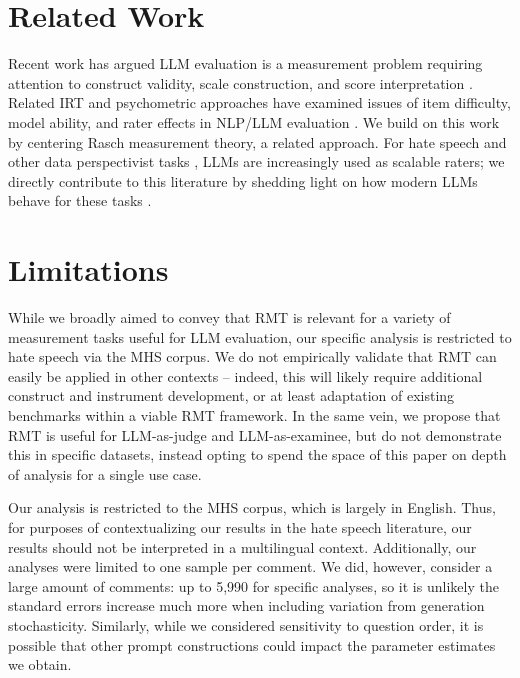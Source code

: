 \documentclass[11pt]{article}
\begin{document}
\section{Related Work}
\label{sec:related}
Recent work has argued LLM evaluation is a measurement problem requiring attention to construct validity, scale construction, and score interpretation \cite{Wallach2025GenAIMeasurement, Salaudeen2025MeasurementToMeaning, Zhou2026GeneralScales}. Related IRT and psychometric approaches have examined issues of item difficulty, model ability, and rater effects in NLP/LLM evaluation \cite{lalor2016building, vania2021comparing, rodriguez2021evaluation, Bachmann2024Psychometrics, Federiakin2025Leaderboards, Chen2025CompactIRT, Yao2025JEIRT, Keller2026StatisticalModels, Choi2026JudgeIRT, Feng2026NoisyJudges, Chen2026NoisyJudgeInference, Jiao2026RaterEffects, Wu2026EssayRaters, Jin2025MFRMWriting}. We build on this work by centering Rasch measurement theory, a related approach. For hate speech and other data perspectivist tasks \cite{cabitza2023toward}, LLMs are increasingly used as scalable raters; we directly contribute to this literature by shedding light on how modern LLMs behave for these tasks \cite{sap2022annotators,giorgi2025human, Okpala2025LLMAnnotationBias}.

\section*{Limitations}

While we broadly aimed to convey that RMT is relevant for a variety of measurement tasks useful for LLM evaluation, our specific analysis is restricted to hate speech via the MHS corpus. We do not empirically validate that RMT can easily be applied in other contexts -- indeed, this will likely require additional construct and instrument development, or at least adaptation of existing benchmarks within a viable RMT framework. In the same vein, we propose that RMT is useful for LLM-as-judge and LLM-as-examinee, but do not demonstrate this in specific datasets, instead opting to spend the space of this paper on depth of analysis for a single use case.

Our analysis is restricted to the MHS corpus, which is largely in English. Thus, for purposes of contextualizing our results in the hate speech literature, our results should not be interpreted in a multilingual context. Additionally, our analyses were limited to one sample per comment. We did, however, consider a large amount of comments: up to 5,990 for specific analyses, so it is unlikely the standard errors increase much more when including variation from generation stochasticity. Similarly, while we considered sensitivity to question order, it is possible that other prompt constructions could impact the parameter estimates we obtain.
\end{document}

